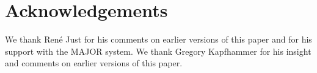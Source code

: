 \documentclass[conference]{IEEEtran}
\begin{document}






\section{Acknowledgements}                                                       
We thank Ren\'e Just for his comments on earlier versions of this paper and for his support with the MAJOR system. 
We thank Gregory Kapfhammer for his insight and comments on earlier versions of this 
paper.



\end{document}
